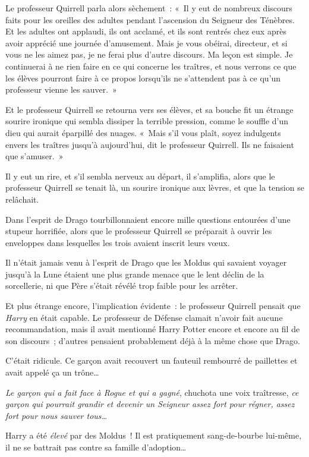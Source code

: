 Le professeur Quirrell parla alors sèchement~: «~Il y eut de nombreux discours faits pour les oreilles des adultes pendant l'ascension du Seigneur des Ténèbres.
Et les adultes ont applaudi, ils ont acclamé, et ils sont rentrés chez eux après avoir apprécié une journée d'amusement.
Mais je vous obéirai, directeur, et si vous ne les aimez pas, je ne ferai plus d'autre discours.
Ma leçon est simple.
Je continuerai à ne rien faire en ce qui concerne les traîtres, et nous verrons ce que les élèves pourront faire à ce propos lorsqu'ils ne s'attendent pas à ce qu'un professeur vienne les sauver.~»

Et le professeur Quirrell se retourna vers ses élèves, et sa bouche fit un étrange sourire ironique qui sembla dissiper la terrible pression, comme le souffle d'un dieu qui aurait éparpillé des nuages.
«~Mais s'il vous plaît, soyez indulgents envers les traîtres jusqu'à aujourd'hui, dit le professeur Quirrell.
Ils ne faisaient que s'amuser.~»

Il y eut un rire, et s'il sembla nerveux au départ, il s'amplifia, alors que le professeur Quirrell se tenait là, un sourire ironique aux lèvres, et que la tension se relâchait.

\later

Dans l'esprit de Drago tourbillonnaient encore mille questions entourées d'une stupeur horrifiée, alors que le professeur Quirrell se préparait à ouvrir les enveloppes dans lesquelles les trois avaient inscrit leurs vœux.

Il n'était jamais venu à l'esprit de Drago que les Moldus qui savaient voyager jusqu'à la Lune étaient une plus grande menace que le lent déclin de la sorcellerie, ni que Père s'était révélé trop faible pour les arrêter.

Et plus étrange encore, l'implication évidente~: le professeur Quirrell pensait que \emph{Harry} en était capable.
Le professeur de Défense clamait n'avoir fait aucune recommandation, mais il avait mentionné Harry Potter encore et encore au fil de son discours~; d'autres pensaient probablement déjà à la même chose que Drago.

C'était ridicule.
Ce garçon avait recouvert un fauteuil rembourré de paillettes et avait appelé ça un trône…

\emph{Le garçon qui a fait face à Rogue et qui a gagné}, chuchota une voix traîtresse, \emph{ce garçon qui pourrait grandir et devenir un Seigneur assez fort pour régner, assez fort pour nous sauver tous…}

Harry a été \emph{élevé} par des Moldus~!
Il est pratiquement sang-de-bourbe lui-même, il ne se battrait pas contre sa famille d'adoption…

